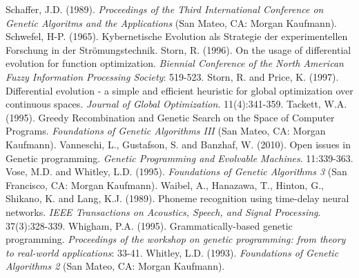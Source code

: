 \documentclass[spanish,a4paper,12pt,twoside]{report}
\begin{document}
\begin{thebibliography}{00}
   Schaffer, J.D. (1989). \emph{Proceedings of the Third International Conference on Genetic Algoritms and the Applications} (San Mateo, CA: Morgan Kaufmann).
   Schwefel, H-P. (1965). Kybernetische Evolution als Strategie der experimentellen Forschung in der Strömungstechnik.
   Storn, R. (1996). On the usage of differential evolution for function optimization. \emph{Biennial Conference of the North American Fuzzy Information Processing Society}: 519-523.
   Storn, R. and Price, K. (1997). Differential evolution - a simple and efficient heuristic for global optimization over continuous spaces. \emph{Journal of Global Optimization}. 11(4):341-359.
   Tackett, W.A. (1995). Greedy Recombination and Genetic Search on the Space of Computer Programs. \emph{Foundations of Genetic Algorithms III} (San Mateo, CA: Morgan Kaufmann).
   Vanneschi, L., Gustafson, S. and Banzhaf, W. (2010). Open issues in Genetic programming. \emph{Genetic Programming and Evolvable Machines}. 11:339-363.
   Vose, M.D. and Whitley, L.D. (1995). \emph{Foundations of Genetic Algorithms 3} (San Francisco, CA: Morgan Kaufmann).
   Waibel, A., Hanazawa, T., Hinton, G., Shikano, K. and Lang, K.J. (1989). Phoneme recognition using time-delay neural networks. \emph{IEEE Transactions on Acoustics, Speech, and Signal Processing}. 37(3):328-339.
   Whigham, P.A. (1995). Grammatically-based genetic programming. \emph{Proceedings of the workshop on genetic programming: from theory to real-world applications}: 33-41.
   Whitley, L.D. (1993). \emph{Foundations of Genetic Algorithms 2} (San Mateo, CA: Morgan Kaufmann).
  \end{thebibliography}
  
\end{document}
